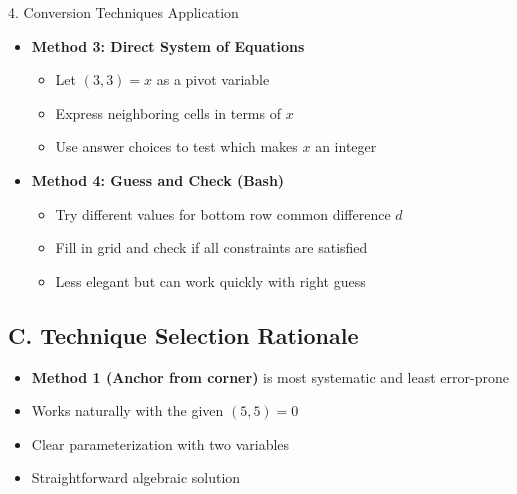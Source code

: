 \documentclass[12pt]{article}
\begin{document}
\begin{conversionbox}{4. Conversion Techniques Application}
\begin{itemize}[leftmargin=*]
    \item \textbf{Method 3: Direct System of Equations}
    \begin{itemize}
        \item Let $(3,3) = x$ as a pivot variable
        \item Express neighboring cells in terms of $x$
        \item Use answer choices to test which makes $x$ an integer
    \end{itemize}
    
    \item \textbf{Method 4: Guess and Check (Bash)}
    \begin{itemize}
        \item Try different values for bottom row common difference $d$
        \item Fill in grid and check if all constraints are satisfied
        \item Less elegant but can work quickly with right guess
    \end{itemize}
\end{itemize}

\subsection*{C. Technique Selection Rationale}
\begin{itemize}[leftmargin=*]
    \item \textbf{Method 1 (Anchor from corner)} is most systematic and least error-prone
    \item Works naturally with the given $(5,5) = 0$
    \item Clear parameterization with two variables
    \item Straightforward algebraic solution
\end{itemize}

\end{conversionbox}
\end{document}
